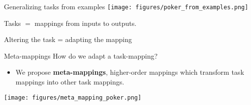 \documentclass{beamer}
\begin{document}
\begin{frame}{Generalizing tasks from examples}
\centering
\texttt{[image: figures/poker\_from\_examples.png]}
\end{frame}

\begin{frame}[standout]
Tasks \(\bm =\) mappings from inputs to outputs.\\[1em] 
\end{frame}

%
%

\begin{frame}{Altering the task = adapting the mapping}
\end{frame}


\begin{frame}{Meta-mappings}
How do we adapt a task-mapping?
\begin{itemize}
\item We propose \textbf{meta-mappings}, higher-order mappings which transform task mappings into other task mappings.
\end{itemize}
\texttt{[image: figures/meta\_mapping\_poker.png]}
\end{frame}
\end{document}
